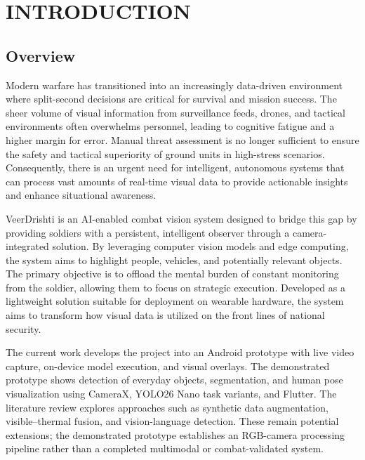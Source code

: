 \chapter{INTRODUCTION}\label{ch:introduction}

\section{Overview}\label{sec:overview}
Modern warfare has transitioned into an increasingly data-driven environment where split-second
decisions are critical for survival and mission success. The sheer volume of visual information from
surveillance feeds, drones, and tactical environments often overwhelms personnel, leading to
cognitive fatigue and a higher margin for error. Manual threat assessment is no longer sufficient to
ensure the safety and tactical superiority of ground units in high-stress scenarios. Consequently,
there is an urgent need for intelligent, autonomous systems that can process vast amounts of
real-time visual data to provide actionable insights and enhance situational awareness. \vspace{6pt}

VeerDrishti is an AI-enabled combat vision system designed to bridge this gap by providing soldiers
with a persistent, intelligent observer through a camera-integrated solution. By leveraging
computer vision models and edge computing, the system aims to highlight people, vehicles, and
potentially relevant objects. The primary objective is to offload the mental burden of constant
monitoring from the soldier, allowing them to focus on strategic execution. Developed as a
lightweight solution suitable for deployment on wearable hardware, the system aims to transform how
visual data is utilized on the front lines of national security. \vspace{6pt}

The current work develops the project into an Android prototype with live video capture, on-device
model execution, and visual overlays. The demonstrated prototype shows detection of everyday
objects, segmentation, and human pose visualization using CameraX, YOLO26 Nano task variants, and Flutter.
The literature review explores approaches such as synthetic data augmentation, visible--thermal
fusion, and vision-language detection. These remain potential extensions; the demonstrated
prototype establishes an RGB-camera processing pipeline rather than a completed multimodal or
combat-validated system.

\label{end:overview}
